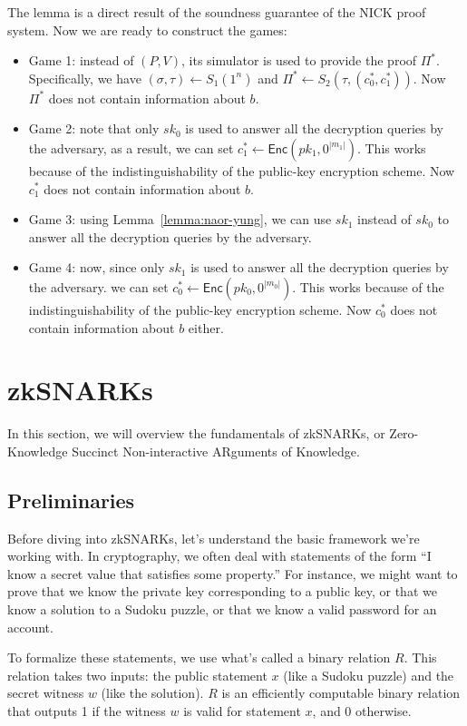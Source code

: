 \documentclass[12pt]{tufte-book}
\begin{document}
The lemma is a direct result of the soundness guarantee of the NICK proof system. Now we are ready to construct the games:
\begin{itemize}
    \item Game 1: instead of $(P, V)$, its simulator is used to provide the proof $\Pi^*$. Specifically, we  have $(\sigma, \tau) \gets S_1(1^n)$ and $\Pi^* \gets S_2(\tau, (c_0^*, c_1^*))$. Now $\Pi^*$ does not contain information about $b$.
    \item Game 2: note that only $sk_0$ is used to answer all the decryption queries by the adversary, as a result, we can set $c_1^*\gets \mathsf{Enc}(pk_1, 0^{|m_1|})$. This works because of the indistinguishability of the public-key encryption scheme. Now $c_1^*$ does not contain information about $b$.
    \item Game 3: using Lemma~\ref{lemma:naor-yung}, we can use $sk_1$ instead of $sk_0$ to answer all the decryption queries by the adversary.
    \item Game 4: now, since only $sk_1$ is used to answer all the decryption queries by the adversary. we can set $c_0^*\gets \mathsf{Enc}(pk_0, 0^{|m_0|})$. This works because of the indistinguishability of the public-key encryption scheme. Now $c_0^*$ does not contain information about $b$ either.
\end{itemize}


\section{zkSNARKs}

In this section, we will overview the fundamentals of zkSNARKs, or Zero-Knowledge Succinct Non-interactive ARguments of Knowledge.

\subsection{Preliminaries}

Before diving into zkSNARKs, let's understand the basic framework we're working with. In cryptography, we often deal with statements of the form ``I know a secret value that satisfies some property.'' For instance, we might want to prove that we know the private key corresponding to a public key, or that we know a solution to a Sudoku puzzle, or that we know a valid password for an account.

To formalize these statements, we use what's called a binary relation $R$. This relation takes two inputs: the public statement $x$ (like a Sudoku puzzle) and the secret witness $w$ (like the solution). $R$ is an efficiently computable binary relation that outputs 1 if the witness $w$ is valid for statement $x$, and 0 otherwise.
\end{document}
